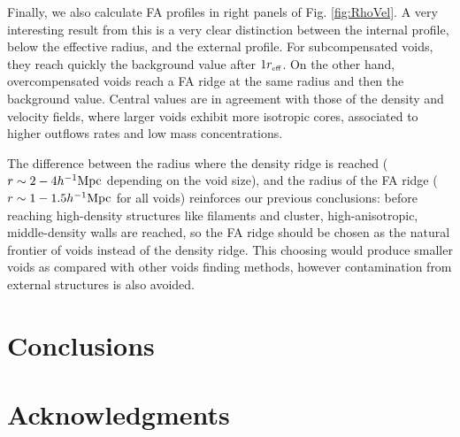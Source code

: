 \documentclass[a4,useAMS,usenatbib,usegraphicx]{latex/mn2e}
\begin{document}
Finally, we also calculate FA profiles in right panels of Fig. \ref{fig:RhoVel}.
A very interesting result from this is a very clear distinction between
the internal profile, below the effective radius, and the external profile. 
For subcompensated voids, they reach quickly the background 
value after $1\reff$. On the other hand, overcompensated voids reach a FA 
ridge at the same radius and then the background value. Central values are
in agreement with those of the density and velocity fields, where larger 
voids exhibit more isotropic cores, associated to higher outflows rates 
and low mass concentrations.


The difference between the radius where the density ridge is reached 
($r\sim 2-4\hMpc$ depending on the void size), and the radius of the FA 
ridge ($r\sim 1-1.5\hMpc$ for all voids) reinforces our previous 
conclusions: before reaching high-density structures like filaments and 
cluster, high-anisotropic, middle-density walls are reached, so the FA 
ridge should be chosen as the natural frontier of voids instead of the
density ridge. This choosing would produce smaller voids as compared with
other voids finding methods, however contamination from external structures
is also avoided.


\section{Conclusions}
\label{sec:conclusions}


\section*{Acknowledgments}  






  


\end{document}

